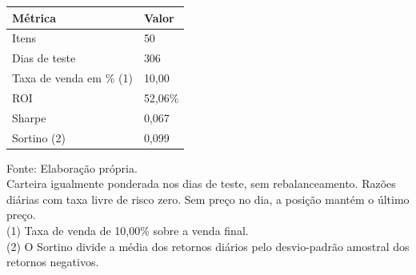 \begingroup
\setlength{}
\setlength{}
\fontsize{12.0pt}{14.4pt}\selectfont

\setlength{\LTpost}{0mm}
\begin{longtable}{@{\extracolsep{\fill}}ll}

\toprule
\textbf{Métrica} & \textbf{Valor} \\ 
\midrule\addlinespace[2.5pt]
Itens & 50 \\
Dias de teste & 306 \\
Taxa de venda em \% (1) & 10,00 \\
ROI & 52,06\% \\
Sharpe & 0,067 \\
Sortino (2) & 0,099 \\
\bottomrule
\end{longtable}
\begin{minipage}{\linewidth}
Fonte: Elaboração própria.\\
Carteira igualmente ponderada nos dias de teste, sem rebalanceamento. Razões diárias com taxa livre de risco zero. Sem preço no dia, a posição mantém o último preço.\\
(1) Taxa de venda de 10,00\% sobre a venda final.\\
(2) O Sortino divide a média dos retornos diários pelo desvio-padrão amostral dos retornos negativos.\\
\end{minipage}
\endgroup
